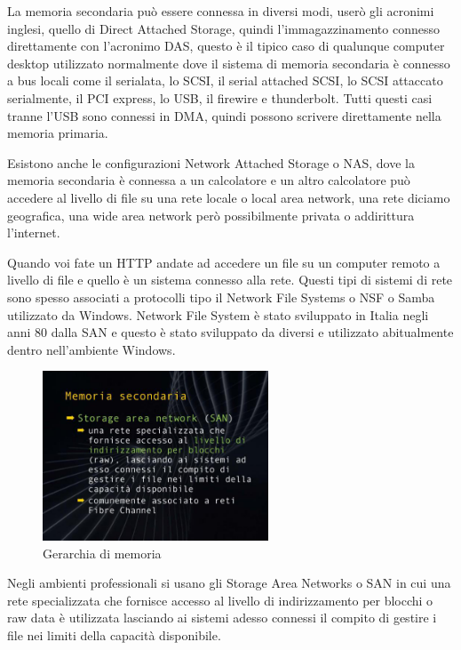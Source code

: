 La memoria secondaria può essere connessa in diversi modi, userò gli acronimi inglesi, quello di Direct Attached Storage, quindi l'immagazzinamento connesso direttamente con l'acronimo DAS, questo è il tipico caso di qualunque computer desktop utilizzato normalmente dove il sistema di memoria secondaria è connesso a bus locali come il serialata, lo SCSI, il serial attached SCSI, lo SCSI attaccato serialmente, il PCI express, lo USB, il firewire e thunderbolt.
Tutti questi casi tranne l'USB sono connessi in DMA, quindi possono scrivere direttamente nella memoria primaria.

Esistono anche le configurazioni Network Attached Storage o NAS, dove la memoria secondaria è connessa a un calcolatore e un altro calcolatore può accedere al livello di file su una rete locale o local area network, una rete diciamo geografica, una wide area network però possibilmente privata o addirittura l'internet.

Quando voi fate un HTTP andate ad accedere un file su un computer remoto a livello di file e quello è un sistema connesso alla rete.
Questi tipi di sistemi di rete sono spesso associati a protocolli tipo il Network File Systems o NSF o Samba utilizzato da Windows.
Network File System è stato sviluppato in Italia negli anni 80 dalla SAN e questo è stato sviluppato da diversi e utilizzato abitualmente dentro nell'ambiente Windows.

\FloatBarrier
\begin{figure}[H]
  \centering
  \includegraphics[width=0.60\textwidth,
                    trim=20 20 10 20, %
                    clip]
                    {images/Lez06_p02_fig_05.png}
  \caption{Gerarchia di memoria}
  \label{fig:Lez06_p02_fig_05}
\end{figure}
\FloatBarrier
\noindent

Negli ambienti professionali si usano gli Storage Area Networks o SAN in cui una rete specializzata che fornisce accesso al livello di indirizzamento per blocchi o raw data è utilizzata lasciando ai sistemi adesso connessi il compito di gestire i file nei limiti della capacità disponibile.

